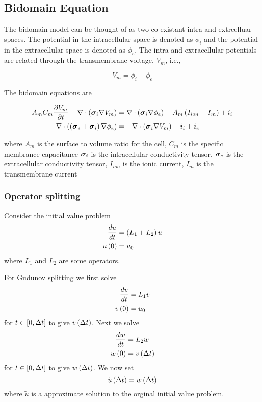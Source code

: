\subsection{Bidomain Equation}

The bidomain model can be thought of as two co-existant intra and extrcelluar
spaces. The potential in the intracellular space is denoted as
$\phi_{i}$ and the potential in the extracellular space is denoted as
$\phi_{e}$. The intra and extracellular potentials are related through the
transmembrane voltage, $V_{m}$, i.e.,

\begin{equation}
  V_{m}=\phi_{i}-\phi_{e}
  \label{eqn:transmembranevoltage}
\end{equation} 

The bidomain equations are

\begin{align}
  A_{m}C_{m} \dfrac{\partial V_{m}}{\partial t} - \nabla\cdot\left( \boldsymbol{\sigma}_{i}\nabla{V_{m}} \right) &= \nabla\cdot\left( \boldsymbol{\sigma}_{i}\nabla{\phi_{e}} \right) -A_{m}\left( I_{ion}-I_{m} \right)+i_{i} \label{eqn:bidomain1}
  \\
   \nabla\cdot\left( \left( \boldsymbol{\sigma}_{e}+\boldsymbol{\sigma}_{i} \right)\nabla{\phi_{e}} \right) &=- \nabla\cdot\left( \boldsymbol{\sigma}_{i}\nabla{V_{m}} \right) -i_{i}+i_{e}
  \label{eqn:bidomain2}
\end{align}

where $A_{m}$ is the surface to volume ratio for the cell, $C_{m}$ is
the specific membrance capacitance $\boldsymbol{\sigma}_{i}$ is the intracellular
conductivity tensor, $\boldsymbol{\sigma}_{e}$ is the extracellular
conductivity tensor, $I_{ion}$ is the ionic current, $I_{m}$ is the
transmembrane current

\subsubsection{Operator splitting}

Consider the initial value problem
\begin{align}
   \dfrac{ d u}{d t} &=\left( L_{1}+L_{2} \right)u \\
   u\left( 0 \right) &=u_{0}
\end{align}
where $L_{1}$ and $L_{2}$ are some operators.

For Gudunov splitting we first solve
\begin{align}
   \dfrac{ d v}{d t} &=L_{1}v \\
   v\left( 0 \right) &=u_{0}
\end{align}
for $t\in\left[ 0,\Delta t \right]$ to give $ v\left( \Delta t \right) $. Next we solve
\begin{align}
   \dfrac{ d w}{d t} &=L_{2}w \\
   w\left( 0 \right) &= v\left( \Delta t \right) 
\end{align}
for $t\in\left[ 0,\Delta t \right]$ to give $ w\left( \Delta t \right) $. We now set
\begin{equation}
 \tilde{u}\left( \Delta t \right) = w\left( \Delta t \right) 
\end{equation}
where $\tilde{u}$ is a approximate solution to the orginal initial value
problem.

